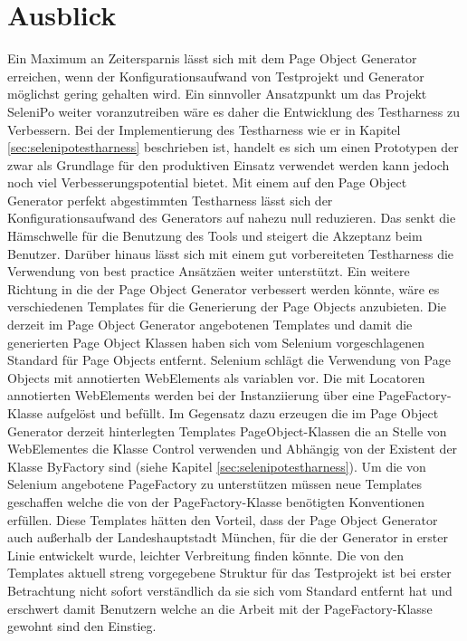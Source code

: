 \section{Ausblick}
Ein Maximum an Zeitersparnis lässt sich mit dem Page Object Generator erreichen, wenn der Konfigurationsaufwand von Testprojekt und Generator möglichst gering gehalten wird.
Ein sinnvoller Ansatzpunkt um das Projekt SeleniPo weiter voranzutreiben wäre es daher die Entwicklung des Testharness zu Verbessern. Bei der Implementierung des Testharness wie er in Kapitel \ref{sec:selenipotestharness} beschrieben ist, handelt es sich um einen Prototypen der zwar als Grundlage für den produktiven Einsatz verwendet werden kann jedoch noch viel Verbesserungspotential bietet. Mit einem auf den Page Object Generator perfekt abgestimmten Testharness lässt sich der Konfigurationsaufwand des Generators auf nahezu null reduzieren. Das senkt die Hämschwelle für die Benutzung des Tools und steigert die Akzeptanz beim Benutzer.
Darüber hinaus lässt sich mit einem gut vorbereiteten Testharness die Verwendung von best practice Ansätzäen weiter unterstützt.
Ein weitere Richtung in die der Page Object Generator verbessert werden könnte, wäre es verschiedenen Templates für die Generierung der Page Objects anzubieten.
Die derzeit im Page Object Generator angebotenen Templates und damit die generierten Page Object Klassen haben sich vom Selenium vorgeschlagenen Standard für Page Objects entfernt. Selenium schlägt die Verwendung von Page Objects mit annotierten WebElements als variablen vor. Die mit Locatoren annotierten WebElements werden bei der Instanziierung über eine PageFactory-Klasse aufgelöst und befüllt.
Im Gegensatz dazu erzeugen die im Page Object Generator derzeit hinterlegten Templates PageObject-Klassen die an Stelle von WebElementes die Klasse Control verwenden und Abhängig von der Existent der Klasse ByFactory sind (siehe Kapitel \ref{sec:selenipotestharness}). Um die von Selenium angebotene PageFactory zu unterstützen müssen neue Templates geschaffen welche die von der PageFactory-Klasse benötigten Konventionen erfüllen.
Diese Templates hätten den Vorteil, dass der Page Object Generator auch außerhalb der Landeshauptstadt München, für die der Generator in erster Linie entwickelt wurde, leichter Verbreitung finden könnte. Die von den Templates aktuell streng vorgegebene Struktur für das Testprojekt ist bei erster Betrachtung nicht sofort verständlich da sie sich vom Standard entfernt hat und erschwert damit Benutzern welche an die Arbeit mit der PageFactory-Klasse gewohnt sind den Einstieg.












